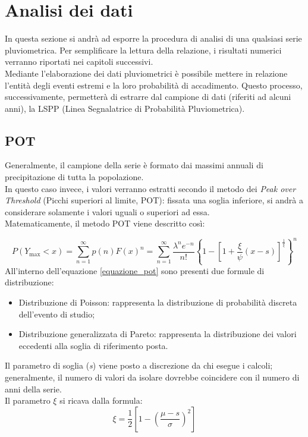 \section{Analisi dei dati}
In questa sezione si andrà ad esporre la procedura di analisi di una qualsiasi serie pluviometrica. Per semplificare la lettura della relazione, i risultati numerici verranno riportati nei capitoli successivi.\\
Mediante l'elaborazione dei dati pluviometrici è possibile mettere in relazione l'entità degli eventi estremi e la loro probabilità di accadimento. Questo processo, successivamente, permetterà di estrarre dal campione di dati (riferiti ad alcuni anni), la LSPP (Linea Segnalatrice di Probabilità Pluviometrica).\\
\subsection{POT}
Generalmente, il campione della serie è formato dai massimi annuali di precipitazione di tutta la popolazione.\\
In questo caso invece, i valori verranno estratti secondo il metodo dei \textit{Peak over Threshold} (Picchi superiori al limite, POT): fissata una soglia inferiore, si andrà a considerare solamente i valori uguali o superiori ad essa.\\
Matematicamente, il metodo POT viene descritto così:

   \begin{equation} 
  P(Y_{\text{max}} < x) = \sum_{n=1}^{\infty} p(n) F(x)^n = \sum_{n=1}^{\infty} \frac{\lambda^n e^{-n}}{n!} \left\{ 1 - \left[ 1 + \frac{\xi}{\psi} (x - s) \right]^{\frac{1}{\xi}} \right\}^n
\label{equazione_pot}   
\end{equation}
All'interno dell'equazione \ref{equazione_pot} sono presenti due formule di distribuzione:
\begin{itemize}
    \item Distribuzione di Poisson: rappresenta la distribuzione di probabilità discreta dell'evento di studio;
    \item Distribuzione generalizzata di Pareto: rappresenta la distribuzione dei valori eccedenti alla soglia di riferimento posta.
\end{itemize}

Il parametro di soglia (\textit{s}) viene posto a discrezione da chi esegue i calcoli; generalmente, il numero di valori da isolare dovrebbe coincidere con il numero di anni della serie.\\
Il parametro $\xi$ si ricava dalla formula:
\begin{equation}
    \xi = \frac{1}{2} \left[1- \left( \frac{\mu - s}{\sigma} \right)^2 \right] 
\end{equation}

